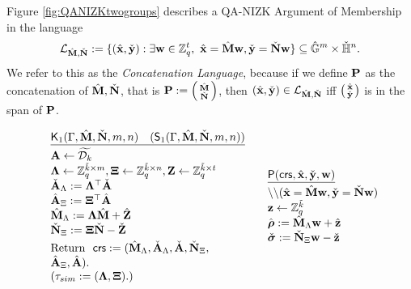 


Figure \ref{fig:QANIZKtwogroups} describes a QA-NIZK Argument of Membership in the language 
$$\mathcal{L}_{\hmatr{M},\cmatr{N}}:=\{ (\hvecb{x},\cvecb{y}): \exists \vecb{w} \in \Z_q^{t}, \ \hvecb{x}=\hmatr{M}\vecb{w},   \cvecb{y}=\cmatr{N}\vecb{w} \} \subseteq \Gr^{m} \times \Hr^{n}.$$
We refer to this as the \textit{Concatenation Language}, because 
if we define $\matr{P}$ as the concatenation of $\hmatr{M},\cmatr{N}$, that is $\matr{P}:=\smallpmatrix{\hmatr{M} \\ \cmatr{N}}$, then  $(\hvecb{x},\cvecb{y}) \in \mathcal{L}_{\hmatr{M},\cmatr{N}}$ iff $\smallpmatrix{\hvecb{x} \\ \cvecb{y}}$ is in the span of $\matr{P}$.
\begin{figure}
$$
\begin{array}{lll}
\begin{array}{l}
\underline{\algK_1(\Gamma,\hmatr{M},\cmatr{N},m,n) \quad  (\mathsf{S}_1(\Gamma,\hmatr{M},\cmatr{N},m,n))}\\[.1cm]
\matr{A} \gets \widetilde{\dist_{k}}\\
\matr{\Lambda} \gets \Z_q^{\tilde{k} \times m}, \matr{\Xi}\gets \Z_q^{\tilde{k}\times n}, \matr{Z} \gets \Z_q^{\tilde{k} \times t}\\
\cmatr{A}_{\Lambda}:= \matr{\Lambda}^\top \cmatr{A}\\
\hmatr{A}_{\Xi}:= \matr{\Xi}^\top\hmatr{A}\\
\hmatr{M}_{\Lambda}:=\matr{\Lambda} \hmatr{M}+\hmatr{Z}\\
\cmatr{N}_{\Xi}:=\matr{\Xi} \cmatr{N}-\cmatr{Z} \\ [.1cm]
\text{Return } \ \mathsf{crs}:=(\hmatr{M}_{\Lambda}, \cmatr{A}_\Lambda , \cmatr{A},\cmatr{N}_{\Xi},\\\hmatr{A}_{\Xi} , \hmatr{A}).\\
(\tau_{sim}:=(\matr{\Lambda},\matr{\Xi}).)
\\
\end{array}
&
\begin{array}{l}
\underline{\algP(\mathsf{crs}, \hvecb{x}, \cvecb{y}, \vecb{w})}\\[.1cm]
\backslash \backslash (\hvecb{x}=\hmatr{M} \vecb{w}, \cvecb{y}=\cmatr{N} \vecb{w})
\\
\matr{z} \gets \Z_q^{\tilde{k}}\\
\hgrkb{\rho}:=\hmatr{M}_{\Lambda} \vecb{w}+ \hvecb{z}\\
\cgrkb{\sigma}:=\cmatr{N}_{\Xi} \vecb{w}- \cvecb{z}\\

\end{array}
\end{array}$$
\end{figure}
